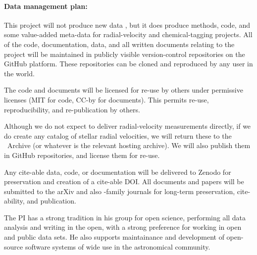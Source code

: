 \documentclass[12pt, fullpage, letterpaper]{article}
\begin{document}
\paragraph{Data management plan:}
This project will not produce new data , but it does produce
methods, code, and some value-added meta-data for radial-velocity and
chemical-tagging projects.
All of the code, documentation, data, and all written documents relating to the
project will be maintained in publicly visible version-control repositories on
the GitHub platform. These repositories can be cloned and reproduced by any
user in the world.

The code and documents will be licensed for re-use by others under permissive
licenses (MIT for code, CC-by for documents). This permits re-use, reproducibility,
and re-publication by others.

Although we do not expect to deliver radial-velocity measurements directly, if
we do create any catalog of stellar radial velocities, we will return these to
the \HARPS\ Archive (or whatever is the relevant hosting archive). We will also
publish them in GitHub repositories, and license them for re-use.

Any cite-able data, code, or documentation will be delivered to Zenodo for
preservation and creation of a cite-able DOI.
All documents and papers will be submitted to the arXiv and also \AAS-family
journals for long-term preservation, cite-ability, and publication.

The PI has a strong tradition in his group for open science, performing
all data analysis and writing in the open, with a strong preference for working
in open and public data sets. He also supports maintainance and development of
open-source software systems of wide use in the astronomical community.
\end{document}
